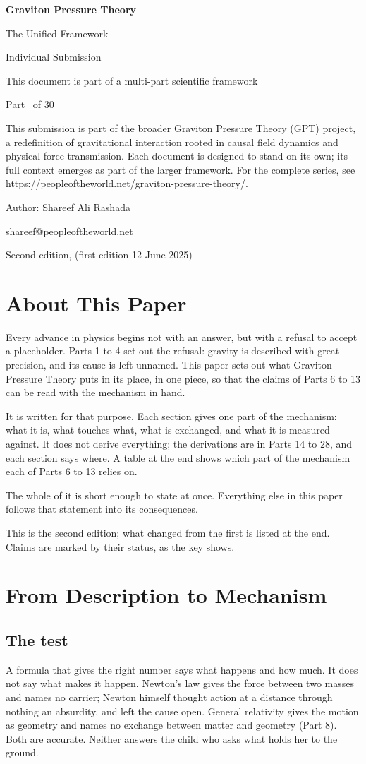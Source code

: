 \documentclass[11pt,a4paper]{article}
\makeatletter
\newcommand{\gptitle}{%
  \begin{titlepage}\centering
  \vspace*{3cm}
  {\Huge\bfseries Graviton Pressure Theory\par}\vspace{0.8cm}
  {\Large The Unified Framework\par}\vspace{0.2cm}
  {\large Individual Submission\par}\vspace{0.6cm}
  {\normalsize This document is part of a multi-part scientific framework\par}\vspace{2cm}
  {\normalsize Part \gptpart\ of 30\par}\vspace{0.8cm}
  {\huge\bfseries \gpttitle\par}\vspace{0.6cm}
  {\Large \gptsubtitle\par}\vspace{1.5cm}
  {\small\begin{minipage}{0.75\textwidth}\centering This submission is part of the broader Graviton Pressure Theory (GPT) project, a redefinition of gravitational interaction rooted in causal field dynamics and physical force transmission. Each document is designed to stand on its own; its full context emerges as part of the larger framework. For the complete series, see https://peopleoftheworld.net/graviton-pressure-theory/.\end{minipage}\par}
  \vfill
  {\large Author: Shareef Ali Rashada\par}\vspace{0.2cm}
  {\normalsize shareef@peopleoftheworld.net\par}\vspace{0.5cm}
  {\normalsize Second edition, \gptdate \quad (first edition 12 June 2025)\par}
  \end{titlepage}
  \setcounter{page}{1}\tableofcontents\clearpage}
\makeatother
\begin{document}
\gptitle

\section*{About This Paper}

Every advance in physics begins not with an answer, but with a refusal to accept a placeholder. Parts 1 to 4 set out the refusal: gravity is described with great precision, and its cause is left unnamed. This paper sets out what Graviton Pressure Theory puts in its place, in one piece, so that the claims of Parts 6 to 13 can be read with the mechanism in hand.

It is written for that purpose. Each section gives one part of the mechanism: what it is, what touches what, what is exchanged, and what it is measured against. It does not derive everything; the derivations are in Parts 14 to 28, and each section says where. A table at the end shows which part of the mechanism each of Parts 6 to 13 relies on.

The whole of it is short enough to state at once.  Everything else in this paper follows that statement into its consequences.

This is the second edition; what changed from the first is listed at the end. Claims are marked by their status, as the key shows.

\statuskey

\section{From Description to Mechanism}

\subsection{The test}

 A formula that gives the right number says what happens and how much. It does not say what makes it happen. Newton's law gives the force between two masses and names no carrier; Newton himself thought action at a distance through nothing an absurdity, and left the cause open. General relativity gives the motion as geometry and names no exchange between matter and geometry (Part 8). Both are accurate. Neither answers the child who asks what holds her to the ground.
\end{document}
